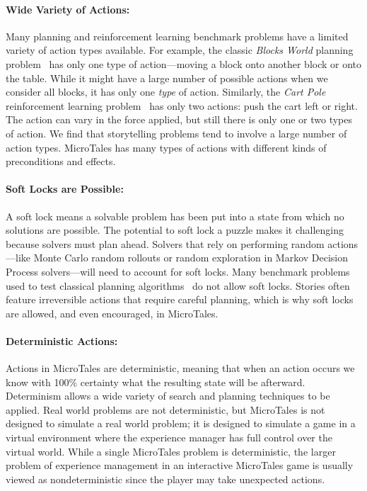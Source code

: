\documentclass{nilreport}
\begin{document}
\paragraph{Wide Variety of Actions:} Many planning and reinforcement learning benchmark problems have a limited variety of action types available. For example, the classic {\em Blocks World} planning problem~\cite{slaney2001blocks} has only one type of action---moving a block onto another block or onto the table. While it might have a large number of possible actions when we consider all blocks, it has only one {\em type} of action. Similarly, the {\em Cart Pole} reinforcement learning problem~\cite{towers2024gymnasium} has only two actions: push the cart left or right. The action can vary in the force applied, but still there is only one or two types of action. We find that storytelling problems tend to involve a large number of action types. MicroTales has many types of actions with different kinds of preconditions and effects.

\paragraph{Soft Locks are Possible:} A soft lock means a solvable problem has been put into a state from which no solutions are possible. The potential to soft lock a puzzle makes it challenging because solvers must plan ahead. Solvers that rely on performing random actions---like Monte Carlo random rollouts or random exploration in Markov Decision Process solvers---will need to account for soft locks. Many benchmark problems used to test classical planning algorithms~\cite{taitler2023ipc} do not allow soft locks. Stories often feature irreversible actions that require careful planning, which is why soft locks are allowed, and even encouraged, in MicroTales.

\paragraph{Deterministic Actions:} Actions in MicroTales are deterministic, meaning that when an action occurs we know with 100\% certainty what the resulting state will be afterward. Determinism allows a wide variety of search and planning techniques to be applied. Real world problems are not deterministic, but MicroTales is not designed to simulate a real world problem; it is designed to simulate a game in a virtual environment where the experience manager has full control over the virtual world. While a single MicroTales problem is deterministic, the larger problem of experience management in an interactive MicroTales game is usually viewed as nondeterministic since the player may take unexpected actions.
\end{document}
